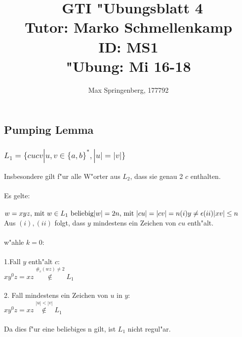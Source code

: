 \documentclass{article}
\author{Max Springenberg, 177792}
\title{\
    GTI "Ubungsblatt 4\\
    Tutor: Marko Schmellenkamp\\
    ID: MS1\\
    "Ubung: Mi 16-18
    }
\date{}
\newcommand{\eps}{\epsilon}
\begin{document}
\maketitle
\newpage

\subsection{Pumping Lemma}

\subsubsection{$L_1 = \{cucv | u,v \in \{a,b\}^*, |u| = |v|\}$}
Insbesondere gilt f"ur alle W"orter aus $L_2$, dass sie genau 2 $c$ enthalten.\\
\\
Es gelte:\\
\\
$w = xyz \text{, mit } w \in L_1 \text{ beliebig}\\
|w| = 2n \text{, mit } |cu| = |cv| = n\\
(i)     y \neq \eps\\
(ii)    |xv| \leq n\\$
\\
Aus $(i), (ii)$ folgt, dass $y$ mindestens ein Zeichen von $cu$ enth"alt.\\
\\
w"ahle $k=0$:\\
\\
1.Fall $y$ enth"alt $c$:\\
$xy^0z = xz \overset{\#_c(wz) \neq 2}{\not \in} L_1$\\
\\
2. Fall mindestens ein Zeichen von $u$ in $y$:\\
$xy^0z = xz \overset{|u| < |v|}{\not \in} L_1$\\
\\
Da dies f"ur eine beliebiges n gilt, ist $L_1$ nicht regul"ar.\\

\end{document}
